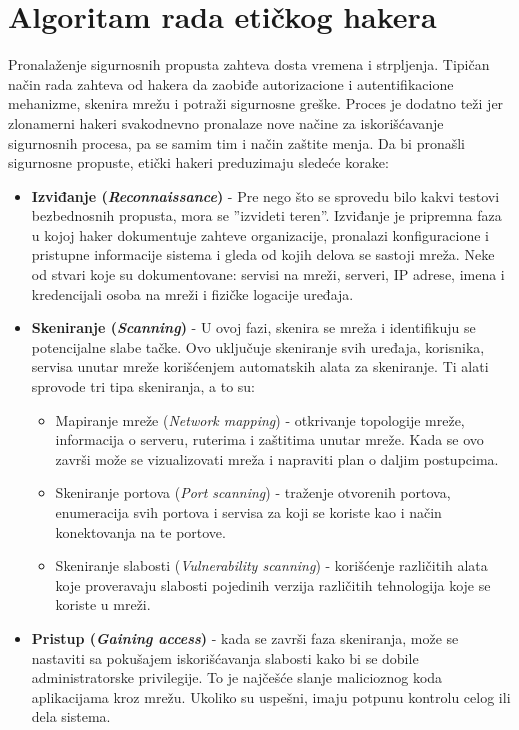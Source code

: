\documentclass[a4paper]{article}
\begin{document}
{\section{Algoritam rada etičkog hakera}
\label{sec:algoritam}
Pronalaženje sigurnosnih propusta zahteva dosta vremena i strpljenja. Tipičan način rada zahteva od hakera da zaobiđe autorizacione i autentifikacione mehanizme, skenira mrežu i potraži sigurnosne greške. Proces je dodatno teži jer zlonamerni hakeri svakodnevno pronalaze nove načine za iskorišćavanje sigurnosnih procesa, pa se samim tim i način zaštite menja.
Da bi pronašli sigurnosne propuste, etički hakeri preduzimaju sledeće korake:
\begin{itemize}
\item \textbf{Izviđanje ({\em Reconnaissance})} - Pre nego što se sprovedu bilo kakvi testovi bezbednosnih propusta, mora se ''izvideti teren''. Izviđanje je pripremna faza u kojoj haker dokumentuje zahteve organizacije, pronalazi konfiguracione i pristupne informacije sistema i gleda od kojih delova se sastoji mreža. Neke od stvari koje su dokumentovane: servisi na mreži, serveri, IP adrese, imena i kredencijali osoba na mreži i fizičke logacije uređaja.
\item \textbf{Skeniranje ({\em Scanning})} - U ovoj fazi, skenira se mreža i identifikuju se potencijalne slabe tačke. Ovo uključuje skeniranje svih uređaja, korisnika, servisa unutar mreže korišćenjem automatskih alata za skeniranje. Ti alati sprovode tri tipa skeniranja, a to su:
\begin{itemize}
\item Mapiranje mreže  ({\em Network mapping})  - otkrivanje topologije mreže, informacija o serveru, ruterima i zaštitima unutar mreže. Kada se ovo završi može se vizualizovati mreža i napraviti plan o daljim postupcima.
\item Skeniranje portova  ({\em Port scanning}) - traženje otvorenih portova, enumeracija svih portova i servisa za koji se koriste kao i način konektovanja na te portove.
\item Skeniranje slabosti  ({\em Vulnerability scanning}) - korišćenje različitih alata koje proveravaju slabosti pojedinih verzija različitih tehnologija koje se koriste u mreži.
\end{itemize}
\item \textbf{Pristup ({\em Gaining access})} - kada se završi faza skeniranja, može se nastaviti sa pokušajem iskorišćavanja slabosti kako bi se dobile administratorske privilegije. To je najčešće slanje malicioznog koda aplikacijama kroz mrežu. Ukoliko su uspešni, imaju potpunu kontrolu celog ili dela sistema.

\end{itemize}}
\end{document}
